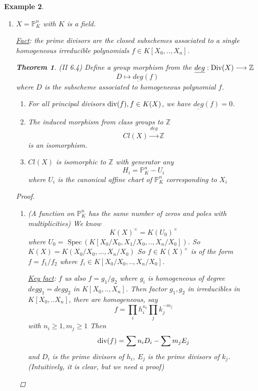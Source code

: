 \documentclass[11pt]{article}
\newtheorem{thm}{Theorem}[section]
\newtheorem{ex}[thm]{Example}
\newcommand{\spec}{\text{ Spec}\,}
\newcommand{\proj}{\mathbb P}
\newcommand{\intg}{\mathbb Z}
\newcommand{\ratl}{\mathbb Q}
\renewcommand{\div}{\textnormal{div}}
\newcommand{\Div}{\textnormal{Div}}
\newcommand{\lrta}{\longrightarrow}
\begin{document}
\begin{ex}
\begin{enumerate}[label=(\arabic*)]
We sketch the reason here.
$$
H(L)=\{\text{fractional ideals}\}/\{\text{ principal ideals}\}
$$
where $\{\text{fractional ideals}\}\simeq\text{free Abelian group generated by prime ideals}$ and  a fractional ideal is principal iff it is associated to a principal ideal.

There are still many open questions: are there infinitely many $L/\ratl$ with $Cl(\spec A)=0$? (i.e. $A$ UFD)

How are $Cl(\spec A)$ distributed when $L/\ratl$ varies? (Cohen-Lenstra Heuristics)

\item $X=\proj^n_K$ with $K$ is a field.

\underline{Fact}: the prime divisors are the closed subschemes associated to a single homogeneous irreducible polynomials $f\in  K[X_0,..,X_n]$.
\begin{thm}
(II 6.4) Define a group morphism from the $\underline{deg}: \Div(X)\lrta \intg$
$$
D\longmapsto \underline{deg}(f)
$$ 
where $D$ is the subscheme associated to homogeneous polynomial $f$.
\begin{enumerate}[label=(\alph*)]
\item For all principal divisors $\div(f), f\in K(X)$, we have $\underline{deg}(f)=0$.
\item The induced morphism from class groups to $\intg$ 
$$
Cl(X)\overset{\underline{deg}}{\lrta }\intg
$$
is  an isomorphism.
\item $Cl(X)$ is isomorphic to $\intg$ with generator any 
$$
H_i=\proj^n_K-U_i
$$
where $U_i$ is  the canonical affine chart of $\proj^n_K$ corresponding to $X_i$
\end{enumerate}
\end{thm}
\begin{proof}
\begin{enumerate}[label=(\alph*)]
\item (A function on $\proj^n_K$ has the same number of zeros and poles with multiplicities) We know
$$
K(X)^\times=K(U_0)^\times
$$
where $U_0=\spec(K[X_0/X_0,X_1/X_0,..,X_n/X_0])$. So $K(X)=K(X_0/X_0,...,X_n/X_0)$
So $f\in K(X)^\times$ is of the form $f=f_1/f_2$ where $f_i \in K[X_0/X_0,..,X_n/X_0]$. 

\underline{Key fact}: 
$f$ us also $f=g_1/g_2$ where $g_i$ is homogeneous of degree $deg g_1=deg g_2$ in $K[X_0,..,X_n]$. Then factor $g_1,g_2$ in irreducibles in $K[X_0,..X_n]$, there are homogeneous, say 
$$
f=\prod_i h_i^{n_i}\prod_j k_j^{-m_j}
$$
with $n_i\geq 1, m_j \geq 1$
Then 
$$
\div(f)=\sum n_i D_i-\sum m_j E_j
$$
and $D_i$ is the prime divisors of $h_i$, $E_j$ is the prime divisors of $k_j$. (Intuitively, it is clear, but we need a proof)


\end{enumerate}
\end{proof}
\end{enumerate}
\end{ex}
\end{document}
